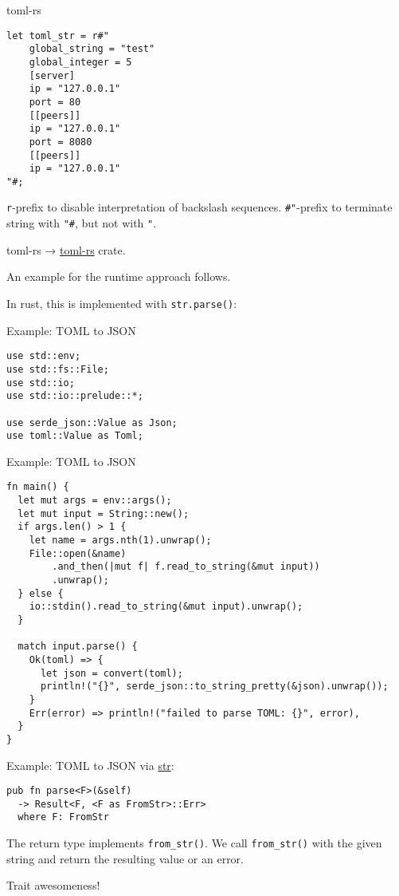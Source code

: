 \documentclass{beamer}
\begin{document}
\begin{frame}[fragile]{toml-rs}
  \begin{verbatim}
let toml_str = r#"
    global_string = "test"
    global_integer = 5
    [server]
    ip = "127.0.0.1"
    port = 80
    [[peers]]
    ip = "127.0.0.1"
    port = 8080
    [[peers]]
    ip = "127.0.0.1"
"#;
  \end{verbatim}
  \texttt{r}-prefix to disable interpretation of backslash sequences.
  \texttt{#"}-prefix to terminate string with \texttt{"#}, but not with \texttt{"}.
\end{frame}

\begin{frame}[fragile]{toml-rs}
  → \href{https://github.com/alexcrichton/toml-rs}{toml-rs} crate.

  An example for the runtime approach follows.

  In rust, this is implemented with \texttt{str.parse()}:
\end{frame}

\begin{frame}[fragile]{Example: TOML to JSON}
  \begin{verbatim}
use std::env;
use std::fs::File;
use std::io;
use std::io::prelude::*;

use serde_json::Value as Json;
use toml::Value as Toml;
  \end{verbatim}
\end{frame}

\begin{frame}[fragile]{Example: TOML to JSON}
  \begin{verbatim}
fn main() {
  let mut args = env::args();
  let mut input = String::new();
  if args.len() > 1 {
    let name = args.nth(1).unwrap();
    File::open(&name)
        .and_then(|mut f| f.read_to_string(&mut input))
        .unwrap();
  } else {
    io::stdin().read_to_string(&mut input).unwrap();
  }

  match input.parse() {
    Ok(toml) => {
      let json = convert(toml);
      println!("{}", serde_json::to_string_pretty(&json).unwrap());
    }
    Err(error) => println!("failed to parse TOML: {}", error),
  }
}
  \end{verbatim}
\end{frame}

\begin{frame}[fragile]{Example: TOML to JSON}
  via \href{https://doc.rust-lang.org/std/primitive.str.html#method.parse}{str}:
  \begin{verbatim}
pub fn parse<F>(&self)
  -> Result<F, <F as FromStr>::Err>
  where F: FromStr
  \end{verbatim}
  The return type implements \texttt{from_str()}. We call \texttt{from_str()} with the given string and return the resulting value or an error.

  Trait awesomeness!
\end{frame}
\end{document}
